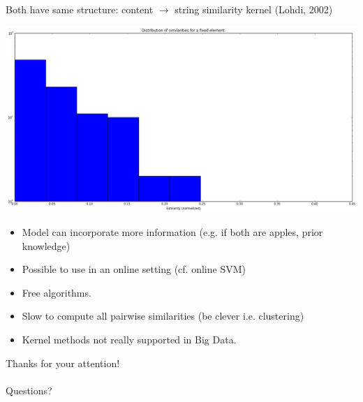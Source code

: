 \documentclass[pdf, 16pt]{beamer}
\begin{document}
\begin{frame}
  \begin{center}
    Both have same structure: content $\rightarrow$ string similarity
      kernel (Lohdi, 2002)
     
    \pause \includegraphics[scale=0.2]{kernel}
  \end{center}
\end{frame}

\begin{frame}[Pros]
    \begin{itemize}
      \item Model can incorporate more information (e.g. if both are apples,
        prior knowledge)
      \item Possible to use in an online setting (cf. online SVM)
      \item Free algorithms.
    \end{itemize}
\end{frame}

\begin{frame}[Cons]
  \begin{itemize}
    \item Slow to compute all pairwise similarities (be clever i.e. clustering)
    \item Kernel methods not really supported in Big Data.
  \end{itemize}
\end{frame}

\begin{frame}
  Thanks for your attention! \\ \\
  Questions?
\end{frame}
\end{document}
